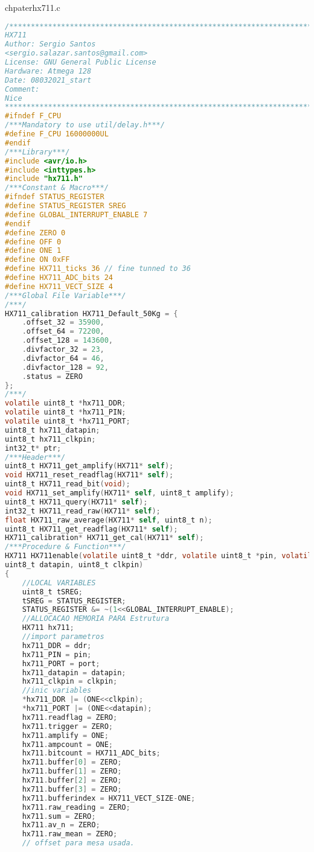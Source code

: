 chpater{hx711.c}
\begin{lstlisting}[language=C, caption={hx711.c}, label=hx711-c, captionpos=b]
/*************************************************************************
HX711
Author: Sergio Santos
<sergio.salazar.santos@gmail.com>
License: GNU General Public License     
Hardware: Atmega 128
Date: 08032021_start
Comment:
Nice
************************************************************************/
#ifndef F_CPU
/***Mandatory to use util/delay.h***/
#define F_CPU 16000000UL
#endif
/***Library***/
#include <avr/io.h>
#include <inttypes.h>
#include "hx711.h"
/***Constant & Macro***/
#ifndef STATUS_REGISTER
#define STATUS_REGISTER SREG
#define GLOBAL_INTERRUPT_ENABLE 7
#endif
#define ZERO 0
#define OFF 0
#define ONE 1
#define ON 0xFF
#define HX711_ticks 36 // fine tunned to 36
#define HX711_ADC_bits 24
#define HX711_VECT_SIZE 4
/***Global File Variable***/
/***/
HX711_calibration HX711_Default_50Kg = {
	.offset_32 = 35900,
	.offset_64 = 72200,
	.offset_128 = 143600,
	.divfactor_32 = 23,
	.divfactor_64 = 46,
	.divfactor_128 = 92,
	.status = ZERO
};
/***/
volatile uint8_t *hx711_DDR;
volatile uint8_t *hx711_PIN;
volatile uint8_t *hx711_PORT;
uint8_t hx711_datapin;
uint8_t hx711_clkpin;
int32_t* ptr;
/***Header***/
uint8_t HX711_get_amplify(HX711* self);
void HX711_reset_readflag(HX711* self);
uint8_t HX711_read_bit(void);
void HX711_set_amplify(HX711* self, uint8_t amplify);
uint8_t HX711_query(HX711* self);
int32_t HX711_read_raw(HX711* self);
float HX711_raw_average(HX711* self, uint8_t n);
uint8_t HX711_get_readflag(HX711* self);
HX711_calibration* HX711_get_cal(HX711* self);
/***Procedure & Function***/
HX711 HX711enable(volatile uint8_t *ddr, volatile uint8_t *pin, volatile uint8_t *port, 
uint8_t datapin, uint8_t clkpin)
{
	//LOCAL VARIABLES
	uint8_t tSREG;
	tSREG = STATUS_REGISTER;
	STATUS_REGISTER &= ~(1<<GLOBAL_INTERRUPT_ENABLE);
	//ALLOCACAO MEMORIA PARA Estrutura
	HX711 hx711;
	//import parametros
	hx711_DDR = ddr;
	hx711_PIN = pin;
	hx711_PORT = port;
	hx711_datapin = datapin;
	hx711_clkpin = clkpin;
	//inic variables
	*hx711_DDR |= (ONE<<clkpin);
	*hx711_PORT |= (ONE<<datapin);
	hx711.readflag = ZERO;
	hx711.trigger = ZERO;
	hx711.amplify = ONE;
	hx711.ampcount = ONE;
	hx711.bitcount = HX711_ADC_bits;
	hx711.buffer[0] = ZERO;
	hx711.buffer[1] = ZERO;
	hx711.buffer[2] = ZERO;
	hx711.buffer[3] = ZERO;
	hx711.bufferindex = HX711_VECT_SIZE-ONE;
	hx711.raw_reading = ZERO;
	hx711.sum = ZERO;
	hx711.av_n = ZERO;
	hx711.raw_mean = ZERO;
	// offset para mesa usada.

\end{lstlisting}
